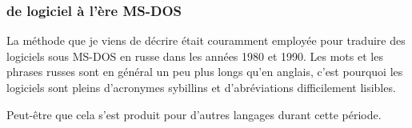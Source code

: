 \subsubsection{ de logiciel à l'ère MS-DOS}

La méthode que je viens de décrire était couramment employée pour traduire des logiciels sous MS-DOS en russe dans les
années 1980 et 1990.
Les mots et les phrases russes sont en général un peu plus longs qu'en anglais, c'est pourquoi les logiciels
 sont pleins d'acronymes sybillins et d'abréviations difficilement lisibles.

Peut-être que cela s'est produit pour d'autres langages durant cette période.

